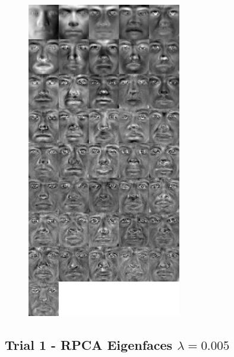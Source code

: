 \documentclass[11pt]{scrartcl} %
\theoremstyle{plain}
\begin{document}
\begin{figure}[H]
\centering
\includegraphics[width=0.6\textwidth]{figures/trial3eigenfaces.jpg}
\end{figure}

\subsection{Trial 1 - RPCA Eigenfaces $\lambda = 0.005$}
\end{document}
